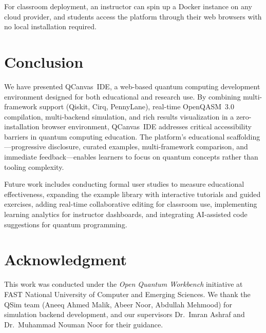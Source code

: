 \documentclass[conference]{IEEEtran}
\begin{document}
For classroom deployment, an instructor can spin up a Docker instance on any cloud provider, and students access the platform through their web browsers with no local installation required.

\section{Conclusion}
\label{sec:conclusion}

We have presented QCanvas~IDE, a web-based quantum computing development environment designed for both educational and research use. By combining multi-framework support (Qiskit, Cirq, PennyLane), real-time OpenQASM~3.0 compilation, multi-backend simulation, and rich results visualization in a zero-installation browser environment, QCanvas~IDE addresses critical accessibility barriers in quantum computing education. The platform's educational scaffolding---progressive disclosure, curated examples, multi-framework comparison, and immediate feedback---enables learners to focus on quantum concepts rather than tooling complexity.

Future work includes conducting formal user studies to measure educational effectiveness, expanding the example library with interactive tutorials and guided exercises, adding real-time collaborative editing for classroom use, implementing learning analytics for instructor dashboards, and integrating AI-assisted code suggestions for quantum programming.

\section*{Acknowledgment}

This work was conducted under the \emph{Open Quantum Workbench} initiative at FAST National University of Computer and Emerging Sciences. We thank the QSim team (Aneeq Ahmed Malik, Abeer Noor, Abdullah Mehmood) for simulation backend development, and our supervisors Dr.~Imran Ashraf and Dr.~Muhammad Nouman Noor for their guidance.


\end{document}
